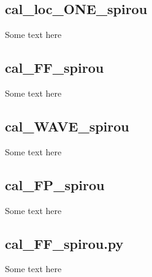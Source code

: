 \subsection{cal\_loc\_ONE\_spirou}

Some text here

\subsection{cal\_FF\_spirou}

Some text here

\subsection{cal\_WAVE\_spirou}

Some text here

\subsection{cal\_FP\_spirou}

Some text here

\subsection{cal\_FF\_spirou.py}

Some text here
